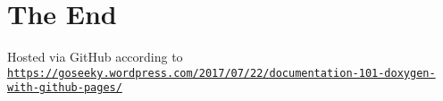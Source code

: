 \hypertarget{index_END}{}\section{The End}\label{index_END}
Hosted via Git\+Hub according to \href{https://goseeky.wordpress.com/2017/07/22/documentation-101-doxygen-with-github-pages/}{\tt https\+://goseeky.\+wordpress.\+com/2017/07/22/documentation-\/101-\/doxygen-\/with-\/github-\/pages/} 